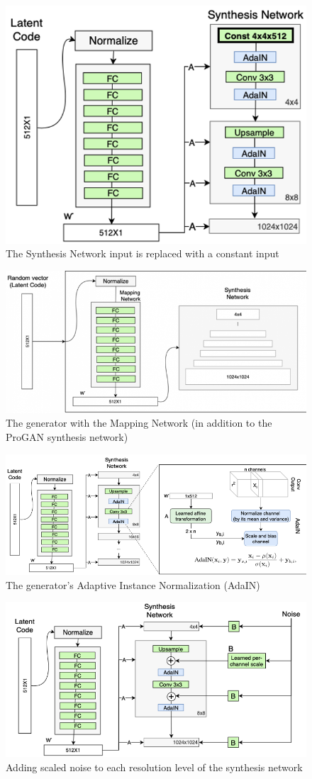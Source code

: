 \documentclass[a4paper,11pt]{article}
\begin{document}
\begin{figure}[htb]
    \centering
    \includegraphics[width=0.5\linewidth]{figure/append-b-01.png}
    \caption{The Synthesis Network input is replaced with a constant input \cite{horev2018style}}
    \label{fig:append-b-01}
\end{figure}

\begin{figure}[htb]
    \centering
    \includegraphics[width=0.6\linewidth]{figure/append-b-02.png}
    \caption{The generator with the Mapping Network (in addition to the ProGAN synthesis network) \cite{horev2018style}}
    \label{fig:append-b-02}
\end{figure}

\begin{figure}[htb]
    \centering
    \includegraphics[width=0.8\linewidth]{figure/append-b-03.png}
    \caption{The generator’s Adaptive Instance Normalization (AdaIN) \cite{horev2018style}}
    \label{fig:append-b-03}
\end{figure}


\begin{figure}[htb]
    \centering
    \includegraphics[width=0.7\linewidth]{figure/append-b-04.png}
    \caption{Adding scaled noise to each resolution level of the synthesis network \cite{horev2018style}}
    \label{fig:append-b-04}
\end{figure}
\end{document}
